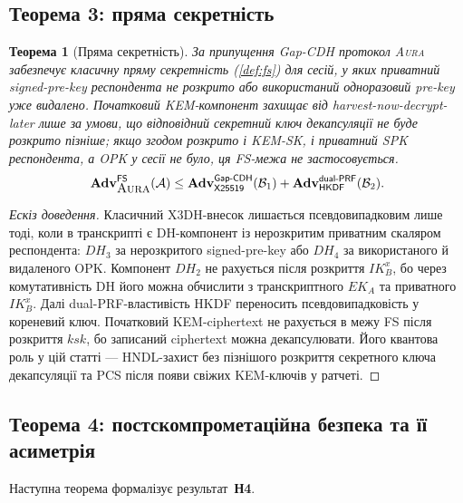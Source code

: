 \documentclass[11pt,a4paper]{article}
\newtheorem{theorem}{Теорема}[section]
\theoremstyle{definition}
\newcommand{\adv}{\ensuremath{\mathbf{Adv}}}
\newcommand{\advA}{\ensuremath{\mathcal{A}}}
\newcommand{\advB}{\ensuremath{\mathcal{B}}}
\newcommand{\HKDF}{\textsf{HKDF}}
\renewcommand{\DH}{\textsf{X25519}}
\newcommand{\GapCDH}{\textsf{Gap-CDH}}
\newcommand{\dualPRF}{\textsf{dual-PRF}}
\newcommand{\IK}{\ensuremath{\mathit{IK}}}
\newcommand{\EK}{\ensuremath{\mathit{EK}}}
\newcommand{\Aura}{\mbox{\normalfont\scshape Aura}}
\begin{document}
\subsection{Теорема 3: пряма секретність}\label{sec:thm3}

\begin{theorem}[Пряма секретність]\label{thm:fs}
За припущення \GapCDH{} протокол \Aura{} забезпечує класичну пряму
секретність (\cref{def:fs}) для сесій, у яких приватний signed-pre-key
респондента не розкрито або використаний одноразовий pre-key уже видалено.
Початковий KEM-компонент захищає від harvest-now-decrypt-later лише за
умови, що відповідний секретний ключ декапсуляції не буде розкрито пізніше;
якщо згодом розкрито і KEM-SK, і приватний SPK респондента, а OPK у сесії
не було, ця FS-межа не застосовується.
\begin{equation}\label{eq:fs-bound}
  \adv^{\mathsf{FS}}_{\Aura}(\advA)
  \le
  \adv^{\GapCDH}_{\DH}(\advB_1)
  + \adv^{\dualPRF}_{\HKDF}(\advB_2).
\end{equation}
\end{theorem}

\begin{proof}[Ескіз доведення]
Класичний X3DH-внесок лишається псевдовипадковим лише тоді, коли в
транскрипті є DH-компонент із нерозкритим приватним скаляром респондента:
$\mathit{DH}_3$ за нерозкритого signed-pre-key або $\mathit{DH}_4$ за
використаного й видаленого OPK. Компонент $\mathit{DH}_2$ не рахується після
розкриття $\IK_B^x$, бо через комутативність DH його можна обчислити з
транскриптного $\EK_A$ та приватного $\IK_B^x$. Далі \dualPRF{}-властивість
HKDF переносить псевдовипадковість у кореневий ключ. Початковий
KEM-ciphertext не рахується в межу FS після розкриття $\mathit{ksk}$, бо
записаний ciphertext можна декапсулювати. Його квантова роль у цій статті —
HNDL-захист без пізнішого розкриття секретного ключа декапсуляції та PCS після появи свіжих
KEM-ключів у ратчеті.
\end{proof}

\subsection{Теорема 4: постскомпрометаційна безпека та її
асиметрія}\label{sec:thm4}

Наступна теорема формалізує результат~\textbf{Н4}.
\end{document}
